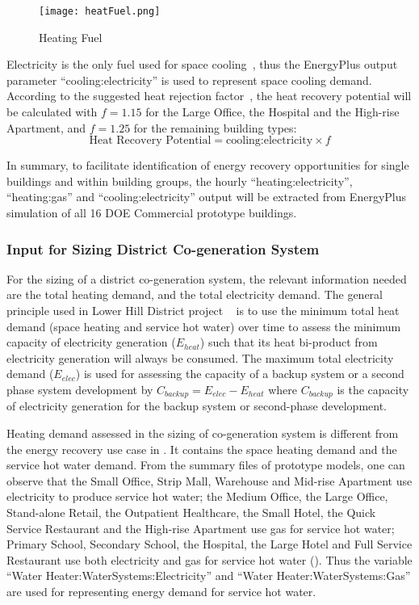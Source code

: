 \begin{figure}[h!]
  \centering
  \texttt{[image: heatFuel.png]}
  \caption[Heating Fuel]{Heating Fuel}
  \label{fig:heatFuel}
\end{figure}

Electricity is the only fuel used for space cooling~\cite{DOE2015},
thus the EnergyPlus output parameter ``cooling:electricity'' is used
to represent space cooling demand. According to the suggested heat
rejection factor~\cite{Bhatia2015}, the heat recovery potential will
be calculated with $f = 1.15$ for the Large Office, the Hospital and the High-rise
Apartment, and $f = 1.25$ for the remaining building types:
\begin{equation}\label{eq:recover}
\text{Heat Recovery Potential} = \text{cooling:electricity} \times f
\end{equation}

In summary, to facilitate identification of energy recovery
opportunities for single buildings and within building groups, the
hourly ``heating:electricity'', ``heating:gas'' and
``cooling:electricity'' output will be extracted from EnergyPlus
simulation of all 16 DOE Commercial prototype buildings.

\subsubsection{Input for Sizing District Co-generation
  System}
For the sizing of a district co-generation system, the relevant
information needed are the total heating demand, and the total
electricity demand. The general principle used in Lower Hill District
project ~\cite{baird2014} is to use the minimum total heat demand
(space heating and service hot water) over time to assess the minimum
capacity of electricity generation ($E_{heat}$) such that its heat
bi-product from electricity generation will always be consumed. The
maximum total electricity demand ($E_{elec}$) is used for assessing
the capacity of a backup system or a second phase system development
by $C_{backup} = E_{elec} - E_{heat}$ where $C_{backup}$ is the
capacity of electricity generation for the backup system or
second-phase development.

Heating demand assessed in the sizing of co-generation system is
different from the energy recovery use case in 
.  It contains the space heating demand and the service hot water
demand. From the summary files of prototype models, one can observe
that the Small Office, Strip Mall, Warehouse and Mid-rise Apartment use
electricity to produce service hot water; the Medium Office, the Large Office,
Stand-alone Retail, the Outpatient Healthcare, the Small Hotel, the Quick Service
Restaurant and the High-rise Apartment use gas for service hot water;
Primary School, Secondary School, the Hospital, the Large Hotel and Full
Service Restaurant use both electricity and gas for service hot water
(). Thus the variable ``Water
Heater:WaterSystems:Electricity'' and ``Water
Heater:WaterSystems:Gas'' are used for representing energy demand for
service hot water.

